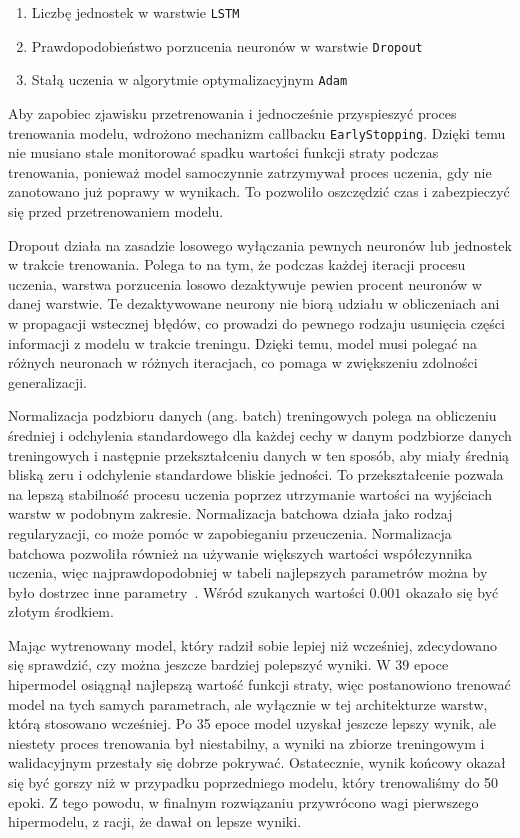 \begin{enumerate}
    \item Liczbę jednostek w warstwie \texttt{LSTM}
    \item Prawdopodobieństwo porzucenia neuronów w warstwie \texttt{Dropout}
    \item Stałą uczenia w algorytmie optymalizacyjnym \texttt{Adam}
\end{enumerate}

Aby zapobiec zjawisku przetrenowania i jednocześnie przyspieszyć proces trenowania modelu, wdrożono mechanizm callbacku \texttt{EarlyStopping}. Dzięki temu nie musiano stale monitorować spadku wartości funkcji straty podczas trenowania, ponieważ model samoczynnie zatrzymywał proces uczenia, gdy nie zanotowano już poprawy w wynikach. To pozwoliło oszczędzić czas i zabezpieczyć się przed przetrenowaniem modelu.

Dropout działa na zasadzie losowego wyłączania pewnych neuronów lub jednostek w trakcie trenowania. Polega to na tym, że podczas każdej iteracji procesu uczenia, warstwa porzucenia losowo dezaktywuje pewien procent neuronów w danej warstwie. Te dezaktywowane neurony nie biorą udziału w obliczeniach ani w propagacji wstecznej błędów, co prowadzi do pewnego rodzaju usunięcia części informacji z modelu w trakcie treningu. Dzięki temu, model musi polegać na różnych neuronach w różnych iteracjach, co pomaga w zwiększeniu zdolności generalizacji.

Normalizacja podzbioru danych (ang. batch) treningowych polega na obliczeniu średniej i odchylenia standardowego dla każdej cechy w danym podzbiorze danych treningowych i następnie przekształceniu danych w ten sposób, aby miały średnią bliską zeru i odchylenie standardowe bliskie jedności. To przekształcenie pozwala na lepszą stabilność procesu uczenia poprzez utrzymanie wartości na wyjściach warstw w podobnym zakresie. Normalizacja batchowa działa jako rodzaj regularyzacji, co może pomóc w zapobieganiu przeuczenia. Normalizacja batchowa pozwoliła również na używanie większych wartości współczynnika uczenia, więc najprawdopodobniej w tabeli najlepszych parametrów można by było dostrzec inne parametry~\cite{ioffe2015}. Wśród szukanych wartości $0.001$ okazało się być złotym środkiem.

Mając wytrenowany model, który radził sobie lepiej niż wcześniej, zdecydowano się sprawdzić, czy można jeszcze bardziej polepszyć wyniki. W 39 epoce hipermodel osiągnął najlepszą wartość funkcji straty, więc postanowiono trenować model na tych samych parametrach, ale wyłącznie w tej architekturze warstw, którą stosowano wcześniej. Po 35 epoce model uzyskał jeszcze lepszy wynik, ale niestety proces trenowania był niestabilny, a wyniki na zbiorze treningowym i walidacyjnym przestały się dobrze pokrywać. Ostatecznie, wynik końcowy okazał się być gorszy niż w przypadku poprzedniego modelu, który trenowaliśmy do 50 epoki. Z tego powodu, w finalnym rozwiązaniu przywrócono wagi pierwszego hipermodelu, z racji, że dawał on lepsze wyniki.

